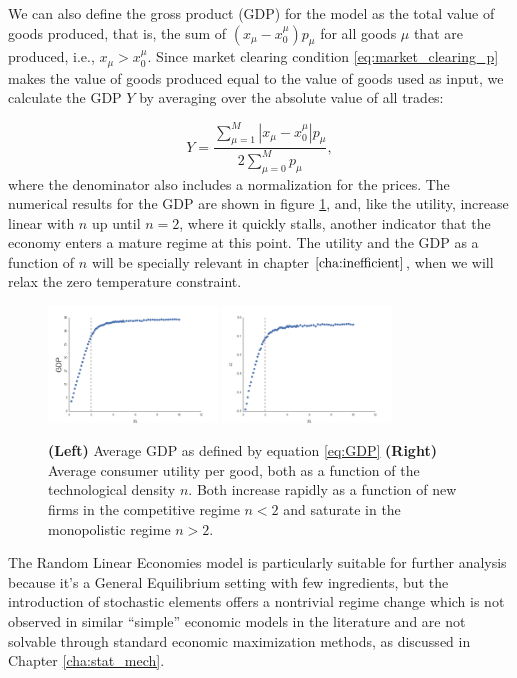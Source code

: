 We can also define the gross product (GDP) for the
model as the total value of goods produced, that is, the sum of
$(x_\mu - x_0^\mu)p_\mu$ for all goods $\mu$ that are produced, i.e.,
$x_\mu > x_0^\mu$. Since market clearing condition
\eqref{eq:market_clearing_p} makes the value of goods produced equal
to the value of goods used as input, we calculate the GDP $Y$ by
averaging over the absolute value of all trades:

\begin{equation}
  \label{eq:GDP}
  Y = \frac{\sum_{\mu = 1}^M |x_\mu - x_0^\mu|p_\mu}{2 \sum_{\mu = 0}^M p_\mu},
\end{equation}
where the denominator also includes a normalization for the prices. The numerical results for the GDP are shown in figure \ref{fig:u_GDP_avg}, and, like the utility, increase linear with $n$ up until $n=2$, where it quickly stalls, another indicator that the economy enters a mature regime at this point. The utility and the GDP as a function of $n$ will be specially relevant in chapter $\ref{cha:inefficient}$, when we will relax the zero temperature constraint.


\begin{figure}[!ht]
  \centering
  \includegraphics[width=0.4\textwidth]{figs_rle/gdp_avg.png}
  \includegraphics[width=0.4\textwidth]{figs_rle/utility_avg.png}
  \caption{\textbf{(Left)} Average GDP as defined by equation \eqref{eq:GDP} \textbf{(Right)} Average consumer utility per good, both as a function of the technological density $n$. Both increase rapidly as a function of new firms in the competitive regime $n < 2$ and saturate in the monopolistic regime $n >2$.}
  \label{fig:u_GDP_avg}
\end{figure}


The Random Linear Economies model is particularly suitable for further
analysis because it's a General Equilibrium setting with few
ingredients, but the introduction of stochastic elements offers a
nontrivial regime change which is not observed in similar
``simple'' economic models in the literature and are not solvable through standard economic maximization methods, as discussed in Chapter \ref{cha:stat_mech}.

